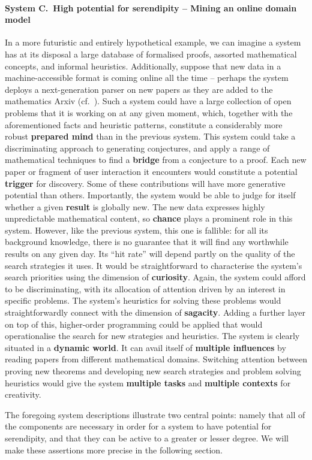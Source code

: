 \paragraph{System C.~High potential for serendipity -- Mining an online domain model} 
In a more futuristic and entirely hypothetical example, we can imagine
a system has at its disposal a large database of formalised proofs,
assorted mathematical concepts, and informal heuristics.
Additionally, suppose that new data in a machine-accessible format is
coming online all the time -- perhaps the system deploys a
next-generation parser on new papers as they are added to the
mathematics Arxiv (cf.~\citet{ginev2009architecture}).  Such a system
could have a large collection of open problems that it is working on
at any given moment, which, together with the aforementioned facts and
heuristic patterns, constitute a considerably more robust
\textbf{prepared mind} than in the previous system.  This system could
take a discriminating approach to generating conjectures, and apply a
range of mathematical techniques to find a \textbf{bridge} from a
conjecture to a proof.
Each new paper or fragment of user interaction it encounters would constitute
a potential \textbf{trigger} for discovery.  Some of these contributions will have
more generative potential than others.  Importantly, the system would
be able to judge for itself whether a given \textbf{result} is globally
new.  The new data expresses highly unpredictable mathematical
content, so \textbf{chance} plays a prominent role in this 
system.  However, like the previous system, this one is fallible: for
all its background knowledge, there is no guarantee that it will find
any worthwhile results on any given day.  Its ``hit rate'' will depend partly on the quality of
the search strategies it uses.  It would be straightforward to
characterise the system's search priorities using the dimension of
\textbf{curiosity}.  Again, the system could afford to be
discriminating, with its allocation of attention driven by an interest in
specific problems.
The system's heuristics for solving these problems would
straightforwardly connect with the dimension of \textbf{sagacity}.
Adding a further layer on top of this, higher-order programming could
be applied that would operationalise the search for new strategies
and heuristics.  The system is clearly situated in a \textbf{dynamic
  world}.  It can avail itself of \textbf{multiple influences} by
reading papers from different mathematical domains.  Switching
attention between proving new theorems and developing new search
strategies and problem solving heuristics would give the system
\textbf{multiple tasks} and \textbf{multiple contexts} for creativity.

\bigskip

The foregoing system descriptions illustrate two central points:
namely that all of the components are necessary in order for a system
to have potential for serendipity, and that they can be active to a
greater or lesser degree.  We will make these assertions more precise
in the following section.




